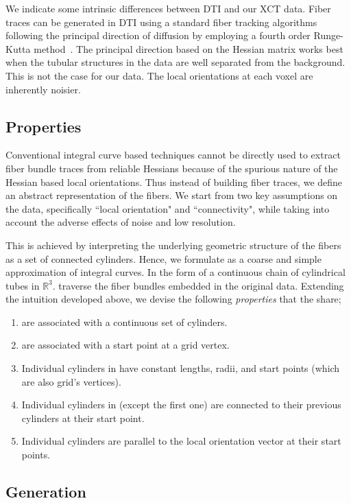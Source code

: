 We indicate some intrinsic differences between DTI and our XCT data. Fiber traces can be generated in DTI using a standard fiber tracking algorithms following the principal direction of diffusion by employing a fourth order Runge-Kutta method~\cite{Brun2003}. The principal direction based on the Hessian matrix works best when the tubular structures in the data are well separated from the background. This is not the case for our data. The local orientations at each voxel are inherently noisier.
\subsection{\mt Properties}\label{subsec:mt_properties}
Conventional integral curve based techniques cannot be directly used to extract fiber bundle traces from reliable Hessians because of the spurious nature of the Hessian based local orientations.
Thus instead of building fiber traces, we define an abstract representation of the fibers.
We start from two key assumptions on the data, specifically ``local orientation" and ``connectivity", while taking into account the adverse effects of noise and low resolution.

This is achieved by interpreting the underlying geometric structure of the fibers as a set of connected cylinders. 
Hence, we formulate \mt as a coarse and simple approximation of integral curves. In the form of a continuous chain of cylindrical tubes in $\mathbb{R}^3$. \mt traverse the fiber bundles embedded in the original data. Extending the intuition developed above, 
we devise the following \textit{properties} that the \mt share;
\begin{enumerate}
	\item{\mt are associated with a continuous set of cylinders.}
	\item{\mt are associated with a start point at a grid vertex.}
	\item{Individual cylinders in \mt have constant lengths, radii, and start points (which are also grid's vertices).}
	\item{Individual cylinders in \mt (except the first one) are connected to their previous cylinders at their start point.}
	\item{Individual cylinders are parallel to the local orientation vector at their start points.}
\end{enumerate} 

\subsection{\mt Generation}\label{subsec:mt_generation}

